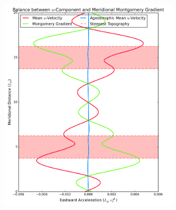 \documentclass[12pt,a4paper]{report}
\begin{document}
\begin{figure}
\begin{subfigure}{0.48\linewidth}
 		\label{fig:vgeolayer2}
 	\end{subfigure}
 	\begin{subfigure}{0.48\linewidth}
 		\centering
 		\caption{}
 		\includegraphics[width=\linewidth ]{vgeo_1}
 		\label{fig:vgeolayer1}
 	\end{subfigure}
 	\quad
 	\begin{subfigure}{0.48\linewidth}
 		\centering
 		\caption{}

\end{subfigure}
\end{figure}
\end{document}
